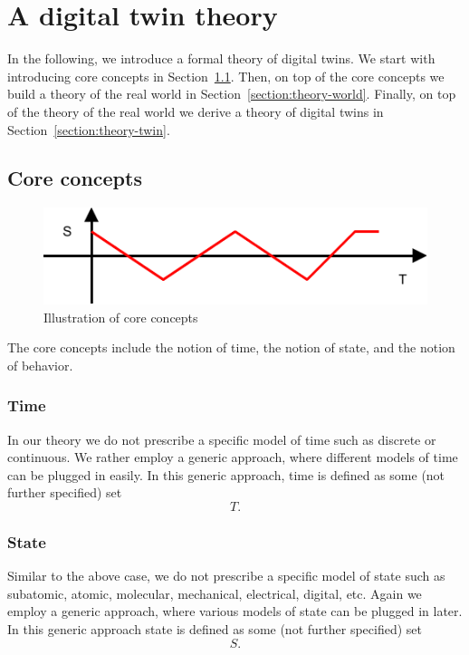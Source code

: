 \documentclass[conference]{IEEEtran}
\begin{document}
    \section{A digital twin theory}
    \label{section:theory}
    In the following, we introduce a formal theory of digital twins.
    We start with introducing core concepts in Section~\ref{section:theory-core}.
    Then, on top of the core concepts we build a theory of the real world in Section~\ref{section:theory-world}.
    Finally, on top of the theory of the real world we derive a theory of digital twins in Section~\ref{section:theory-twin}.

    \subsection{Core concepts}
    \label{section:theory-core}

    \begin{figure}[htbp]
        \centering
        \includegraphics{./figures/theory-core.pdf}
        \caption{Illustration of core concepts}
        \label{figure:theory-core}
    \end{figure}

    The core concepts include the notion of time, the notion of state, and the notion of behavior.

    \subsubsection{Time}
    In our theory we do not prescribe a specific model of time such as discrete or continuous.
    We rather employ a generic approach, where different models of time can be plugged in easily.
    In this generic approach, time is defined as some (not further specified) set
    \[
        T.
    \]

    \subsubsection{State}
    Similar to the above case, we do not prescribe a specific model of state such as subatomic, atomic, molecular, mechanical, electrical, digital, etc.
    Again we employ a generic approach, where various models of state can be plugged in later.
    In this generic approach state is defined as some (not further specified) set
    \[
        S.
    \]
\end{document}
